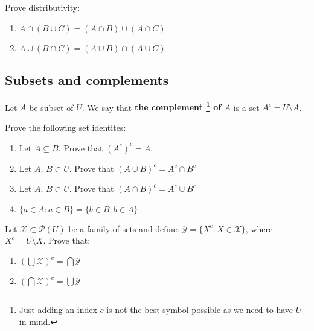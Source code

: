\begin{exercise}
  Prove distributivity:
  \begin{enumerate}
    \item $A\cap (B\cup C)=(A\cap B)\cup (A\cap C)$
    \item $A\cup (B\cap C)=(A\cup B)\cap (A\cup C)$
  \end{enumerate}
\end{exercise}

%

\subsection{Subsets and complements}
\begin{definition}
  Let $A$ be subset of $U$. We say that \textbf{the complement
  \footnote{Just adding an index $c$ is not the best symbol possible as we need to have $U$ in mind.}
  of $A$} is a set $A^c=U\setminus A$.
\end{definition}


\begin{prob}
	Prove the following set identites:
	\begin{enumerate}
		\item Let $A\subseteq B.$ Prove that $(A^c)^c = A$.
		\item Let $A,\, B\subset U$. Prove that $(A\cup B)^c = A^c\cap B^c$
		\item Let $A,\, B\subset U$. Prove that $(A\cap B)^c = A^c\cup B^c$
		\item $\{a\in A : a\in B\} = \{b\in B : b\in A\}$
	\end{enumerate}
\end{prob}

\begin{prob}
	Let $\mathcal X \subset \mathcal P(U)$ be a family of sets and define:
  $\mathcal Y=\{X^c : X\in \mathcal X\}$, where $X^c=U\setminus X$.
  Prove that:
  \begin{enumerate}
    \item $(\bigcup \mathcal X)^c = \bigcap \mathcal Y$
    \item $(\bigcap \mathcal X)^c = \bigcup \mathcal Y$
  \end{enumerate}
\end{prob}

